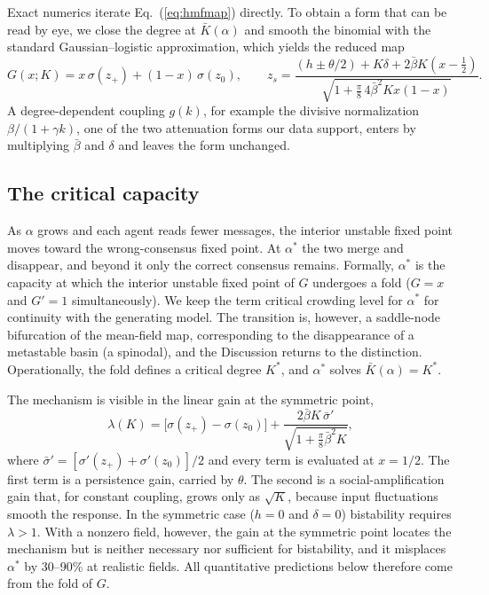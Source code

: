\documentclass[11pt]{article}
\newcommand{\astar}{\alpha^{*}}
\begin{document}
Exact numerics iterate Eq.~(\ref{eq:hmfmap}) directly. To obtain a form
that can be read by eye, we close the degree at $\bar K(\alpha)$ and smooth
the binomial with the standard Gaussian--logistic approximation, which
yields the reduced map
\begin{equation}
G(x;K) = x\,\sigma(z_+) + (1-x)\,\sigma(z_0), \qquad
z_s = \frac{(h \pm \theta/2) + K\delta + 2\bar\beta K (x - \tfrac12)}
{\sqrt{1 + \tfrac{\pi}{8}\, 4\bar\beta^2 K x(1-x)}}.
\end{equation}
A degree-dependent coupling $g(k)$, for example the divisive normalization
$\beta/(1+\gamma k)$, one of the two attenuation forms our data support,
enters by multiplying $\bar\beta$ and $\delta$ and leaves the form
unchanged.

\subsection{The critical capacity}\label{sec:critical}

As $\alpha$ grows and each agent reads fewer messages, the interior
unstable fixed point moves toward the wrong-consensus fixed point. At
$\astar$ the two merge and disappear, and beyond it only the correct
consensus remains. Formally, $\astar$ is the capacity at which the interior
unstable fixed point of $G$ undergoes a fold ($G = x$ and $G' = 1$
simultaneously). We keep the term critical crowding level for $\astar$ for
continuity with the generating model. The transition is, however, a
saddle-node bifurcation of the mean-field map, corresponding to the
disappearance of a metastable basin (a spinodal), and the Discussion
returns to the distinction. Operationally, the fold defines a critical
degree $K^*$, and $\astar$ solves $\bar K(\alpha) = K^*$.

The mechanism is visible in the linear gain at the symmetric point,
\begin{equation}
\lambda(K) = \bigl[\sigma(z_+) - \sigma(z_0)\bigr]
+ \frac{2\bar\beta K\,\bar\sigma'}{\sqrt{1 + \tfrac{\pi}{8}\bar\beta^2 K}},
\end{equation}
where $\bar\sigma' = [\sigma'(z_+) + \sigma'(z_0)]/2$ and every term is
evaluated at $x = 1/2$. The first term is a persistence gain, carried by
$\theta$. The second is a social-amplification gain that, for constant
coupling, grows only as $\sqrt{K}$, because input fluctuations smooth the
response. In the symmetric case ($h = 0$ and $\delta = 0$) bistability
requires $\lambda > 1$. With a nonzero field, however, the gain at the
symmetric point locates the mechanism but is neither necessary nor
sufficient for bistability, and it misplaces $\astar$ by 30--90\% at
realistic fields. All quantitative predictions below therefore come from
the fold of $G$.
\end{document}
